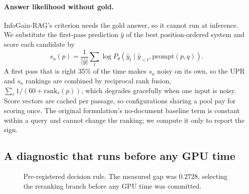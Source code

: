 \documentclass[11pt]{article}
\makeatletter
\newcommand{\hasans}{\textsc{HasAns}@$k$}
\makeatother
\begin{document}
\paragraph{Answer likelihood without gold.} InfoGain-RAG's criterion needs the gold answer, so
it cannot run at inference. We substitute the first-pass prediction $\hat{y}$ of the best
position-ordered system and score each candidate by
\begin{equation}
s_a(p) = \frac{1}{|\hat{y}|}\sum_{t}\log P_\theta\!\left(\hat{y}_t \mid \hat{y}_{<t},
\text{prompt}(p, q)\right).
\end{equation}
A first pass that is right 35\% of the time makes $s_a$ noisy on its own, so the UPR and $s_a$
rankings are combined by reciprocal rank fusion, $\sum_r 1/(60 + \text{rank}_r(p))$, which
degrades gracefully when one input is noisy. Score vectors are cached per passage, so
configurations sharing a pool pay for scoring once. The original formulation's no-document
baseline term is constant within a query and cannot change the ranking; we compute it only to
report the sign.

\subsection{A diagnostic that runs before any GPU time}

\begin{figure}[t]
\centering
{}
\caption{Pre-registered decision rule. The measured gap was $0.2728$, selecting the
reranking branch before any GPU time was committed.}
\label{fig:diag}
\end{figure}
\end{document}
